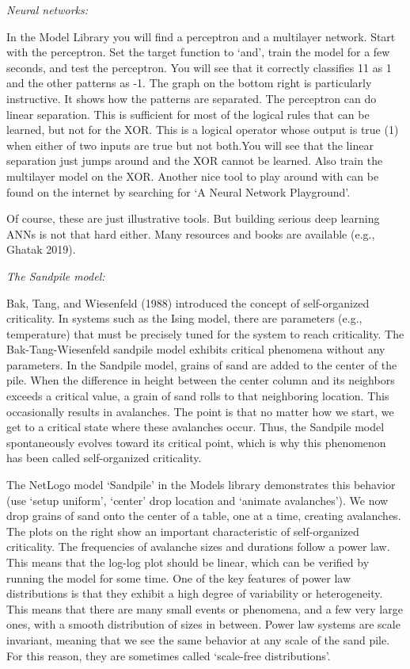 \documentclass[
  a4paper,
  DIV=11,
  numbers=noendperiod,
  oneside]{scrreprt}
\begin{document}
\emph{Neural networks:}

In the Model Library you will find a perceptron and a multilayer
network. Start with the perceptron. Set the target function to `and',
train the model for a few seconds, and test the perceptron. You will see
that it correctly classifies 11 as 1 and the other patterns as -1. The
graph on the bottom right is particularly instructive. It shows how the
patterns are separated. The perceptron can do linear separation. This is
sufficient for most of the logical rules that can be learned, but not
for the XOR. This is a logical operator whose output is true (1) when
either of two inputs are true but not both.You will see that the linear
separation just jumps around and the XOR cannot be learned. Also train
the multilayer model on the XOR. Another nice tool to play around with
can be found on the internet by searching for `A Neural Network
Playground'.

Of course, these are just illustrative tools. But building serious deep
learning ANNs is not that hard either. Many resources and books are
available (e.g., Ghatak 2019).

\emph{The Sandpile model:}

Bak, Tang, and Wiesenfeld (1988) introduced the concept of
self-organized criticality. In systems such as the Ising model, there
are parameters (e.g., temperature) that must be precisely tuned for the
system to reach criticality. The Bak-Tang-Wiesenfeld sandpile model
exhibits critical phenomena without any parameters. In the Sandpile
model, grains of sand are added to the center of the pile. When the
difference in height between the center column and its neighbors exceeds
a critical value, a grain of sand rolls to that neighboring location.
This occasionally results in avalanches. The point is that no matter how
we start, we get to a critical state where these avalanches occur. Thus,
the Sandpile model spontaneously evolves toward its critical point,
which is why this phenomenon has been called self-organized criticality.

The NetLogo model `Sandpile' in the Models library demonstrates this
behavior (use `setup uniform', `center' drop location and `animate
avalanches'). We now drop grains of sand onto the center of a table, one
at a time, creating avalanches. The plots on the right show an important
characteristic of self-organized criticality. The frequencies of
avalanche sizes and durations follow a power law. This means that the
log-log plot should be linear, which can be verified by running the
model for some time. One of the key features of power law distributions
is that they exhibit a high degree of variability or heterogeneity. This
means that there are many small events or phenomena, and a few very
large ones, with a smooth distribution of sizes in between. Power law
systems are scale invariant, meaning that we see the same behavior at
any scale of the sand pile. For this reason, they are sometimes called
`scale-free distributions'.
\end{document}
